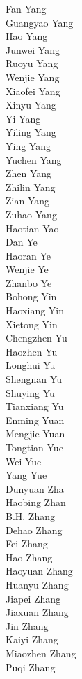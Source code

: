 Fan Yang\\
Guangyao Yang\\
Hao Yang\\
Junwei Yang\\
Ruoyu Yang\\
Wenjie Yang\\
Xiaofei Yang\\
Xinyu Yang\\
Yi Yang\\
Yiling Yang\\
Ying Yang\\
Yuchen Yang\\
Zhen Yang\\
Zhilin Yang\\
Zian Yang\\
Zuhao Yang\\
Haotian Yao\\
Dan Ye\\
Haoran Ye\\
Wenjie Ye\\
Zhanbo Ye\\
Bohong Yin\\
Haoxiang Yin\\
Xietong Yin\\
Chengzhen Yu\\
Haozhen Yu\\
Longhui Yu\\
Shengnan Yu\\
Shuying Yu\\
Tianxiang Yu\\
Enming Yuan\\
Mengjie Yuan\\
Tongtian Yue\\
Wei Yue\\
Yang Yue\\
Dunyuan Zha\\
Haobing Zhan\\
B.H. Zhang\\
Dehao Zhang\\
Fei Zhang\\
Hao Zhang\\
Haoyuan Zhang\\
Huanyu Zhang\\
Jiapei Zhang\\
Jiaxuan Zhang\\
Jin Zhang\\
Kaiyi Zhang\\
Miaozhen Zhang\\
Puqi Zhang\\
